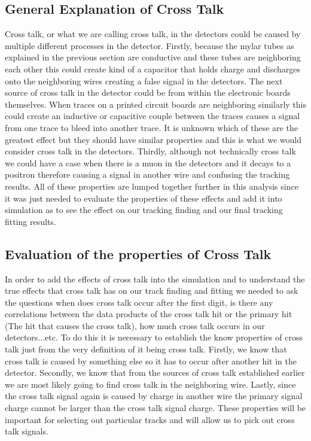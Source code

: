 \documentclass[./Thesis]{subfiles}
\begin{document}
\subsection{General Explanation of Cross Talk}
	Cross talk, or what we are calling cross talk, in the detectors could be caused by multiple different processes in the detector. Firstly, because the mylar tubes as explained in the previous section are conductive and these tubes are neighboring each other this could create kind of a capacitor that holds charge and discharges onto the neighboring wires creating a false signal in the detectors. The next source of cross talk in the detector could be from within the electronic boards themselves. When traces on a printed circuit boards are neighboring similarly this could create an inductive or capacitive couple between the traces causes a signal from one trace to bleed into another trace. It is unknown which of these are the greatest effect but they should have similar properties and this is what we would consider cross talk in the detectors. Thirdly, although not technically cross talk we could have a case when there is a muon in the detectors and it decays to a positron therefore causing a signal in another wire and confusing the tracking results. All of these properties are lumped together further in this analysis since it was just needed to evaluate the properties of these effects and add it into simulation as to see the effect on our tracking finding and our final tracking fitting results.

\subsection{Evaluation of the properties of Cross Talk}
	In order to add the effects of cross talk into the simulation and to understand the true effects that cross talk has on our track finding and fitting we needed to ask the questions when does cross talk occur after the first digit, is there any correlations between the data products of the cross talk hit or the primary hit (The hit that causes the cross talk), how much cross talk occurs in our detectors...etc. To do this it is necessary to establish the know properties of cross talk just from the very definition of it being cross talk. Firstly, we know that cross talk is caused by something else so it has to occur after another hit in the detector. Secondly, we know that from the sources of cross talk established earlier we are most likely going to find cross talk in the neighboring wire. Lastly, since the cross talk signal again is caused by charge in another wire the primary signal charge cannot be larger than the cross talk signal charge.  These properties will be important for selecting out particular tracks and will allow us to pick out cross talk signals.
	
\end{document}
